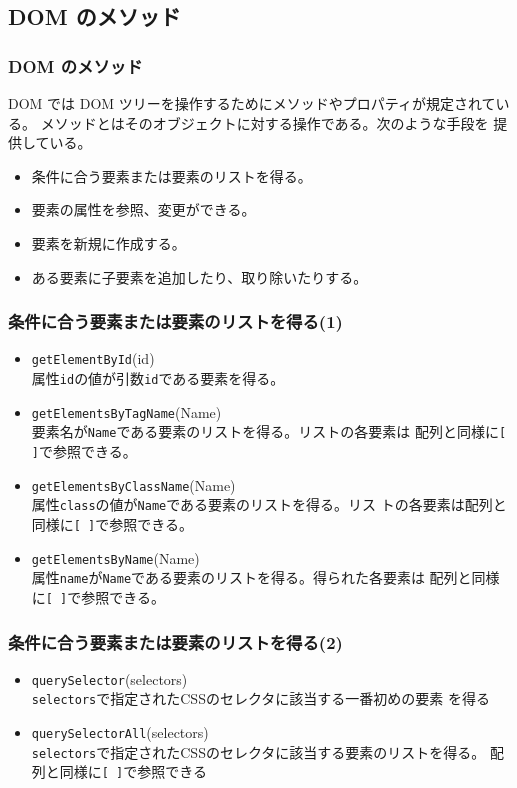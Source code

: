 \subsection{DOM のメソッド}
\begin{frame}[containsverbatim]
 \frametitle{DOM のメソッド}
DOM では DOM ツリーを操作するためにメソッドやプロパティが規定されている。
 メソッドとはそのオブジェクトに対する操作である。次のような手段を
       提供している。
\begin{itemize}
 \item 条件に合う要素または要素のリストを得る。
 \item 要素の属性を参照、変更ができる。
 \item 要素を新規に作成する。
 \item ある要素に子要素を追加したり、取り除いたりする。
\end{itemize}
\end{frame}
\newcommand{\DOMM}{\texttt}
\begin{frame}[containsverbatim]
 \frametitle{条件に合う要素または要素のリストを得る(1)}
\begin{itemize}
 \item \DOMM{getElementById}{(id)}\\
      属性\texttt{id}の値が引数\texttt{id}である要素を得る。
 \item \DOMM{getElementsByTagName}{(Name)}\\
     要素名が\texttt{Name}である要素のリストを得る。リストの各要素は
	  配列と同様に\texttt{[ ]}で参照できる。
 \item \DOMM{getElementsByClassName}{(Name)}\\
     属性\texttt{class}の値が\texttt{Name}である要素のリストを得る。リス
	  トの各要素は配列と同様に\texttt{[ ]}で参照できる。
 \item \DOMM{getElementsByName}{(Name)}\\
     属性\texttt{name}が\texttt{Name}である要素のリストを得る。得られた各要素は
	  配列と同様に\texttt{[ ]}で参照できる。
\end{itemize}
\end{frame}
\begin{frame}[containsverbatim]
 \frametitle{条件に合う要素または要素のリストを得る(2)}
\begin{itemize}
 \item \DOMM{querySelector}{(selectors)}\\
     \texttt{selectors}で指定されたCSSのセレクタに該当する一番初めの要素
	  を得る
 \item \DOMM{querySelectorAll}{(selectors)}\\
     \texttt{selectors}で指定されたCSSのセレクタに該当する要素のリストを得る。
	  配列と同様に\texttt{[ ]}で参照できる
\end{itemize}
\end{frame}

